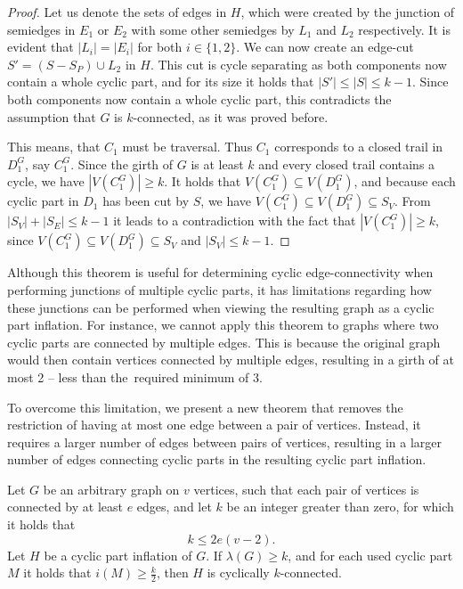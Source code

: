 \documentclass[12pt, twoside]{book}
\begin{document}
\begin{proof}
	Let us denote the sets of edges in $H$, which were created by the junction of semiedges in $E_1$ or $E_2$ with some other semiedges by $L_1$ and $L_2$ respectively. It is evident that $|L_i|=|E_i|$ for both $i\in\{1,2\}$. We can now create an edge-cut $S'=(S-S_P)\cup L_2$ in $H$. This cut is cycle separating as both components now contain a whole cyclic part, and for its size it holds that $|S'|\leq |S|\leq k-1$. Since both components now contain a whole cyclic part, this contradicts the assumption that $G$ is $k$-connected, as it was proved before.
	
	This means, that $C_1$ must be traversal. Thus $C_1$ corresponds to a closed trail in $D_1^G$, say $C_1^G$. Since the girth of $G$ is at least $k$ and every closed trail contains a cycle, we have $|V(C_1^G)|\geq k$. It holds that $V(C_1^G)\subseteq V(D_1^G)$, and because each cyclic part in $D_1$ has been cut by $S$, we have $V(C_1^G)\subseteq V(D_1^G)\subseteq S_V$. From $|S_V|+|S_E|\leq k-1$ it leads to a contradiction with the fact that $|V(C_1^G)|\geq k$, since $V(C_1^G)\subseteq V(D_1^G)\subseteq S_V$ and $|S_V|\leq k-1$.
\end{proof}

Although this theorem is useful for determining cyclic edge-connectivity when performing junctions of multiple cyclic parts, it has limitations regarding how these junctions can be performed when viewing the resulting graph as a cyclic part inflation. For instance, we cannot apply this theorem to graphs where two cyclic parts are connected by multiple edges. This is because the original graph would then contain vertices connected by multiple edges, resulting in a girth of at most 2 -- less than the~required minimum of 3.

To overcome this limitation, we present a new theorem that removes the restriction of having at most one edge between a pair of vertices. Instead, it requires a larger number of edges between pairs of vertices, resulting in a larger number of edges connecting cyclic parts in the resulting cyclic part inflation.

\begin{theorem}\label{th:cyclic-part-inflation-kve}
	Let $G$ be an arbitrary graph on $v$ vertices, such that each pair of vertices is connected by at least $e$ edges, and let $k$ be an integer greater than zero, for which it holds that
	$$k\leq 2e(v-2).$$
	Let $H$ be a cyclic part inflation of $G$. If $\lambda(G)\geq k$, and for each used cyclic part $M$ it holds that $i(M)\geq \frac{k}{2}$, then $H$ is cyclically $k$-connected.
\end{theorem}
\end{document}
